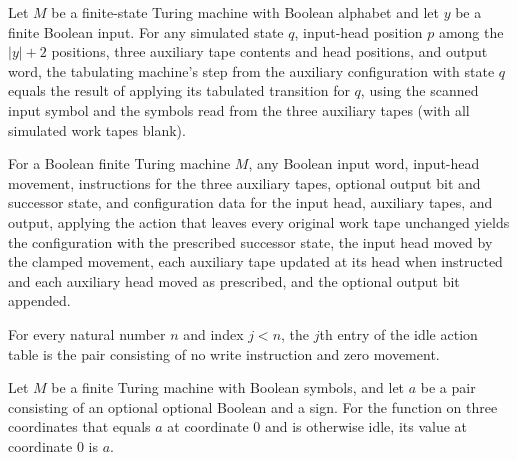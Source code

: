 \begin{theorem}
\label{Complexity.Meyer.acfg_step}
\leanok
{}
Let $M$ be a finite-state Turing machine with Boolean alphabet and let $y$ be a finite
Boolean input. For any simulated state $q$, input-head position $p$ among the $|y|+2$
positions, three auxiliary tape contents and head positions, and output word, the
tabulating machine's step from the auxiliary configuration with state $q$ equals the
result of applying its tabulated transition for $q$, using the scanned input symbol and
the symbols read from the three auxiliary tapes (with all simulated work tapes blank).
\end{theorem}

\begin{theorem}
\label{Complexity.Meyer.tact_idle_apply}
\leanok
{}
For a Boolean finite Turing machine $M$, any Boolean input word, input-head movement,
instructions for the three auxiliary tapes, optional output bit and successor state, and
configuration data for the input head, auxiliary tapes, and output, applying the action
that leaves every original work tape unchanged yields the configuration with the
prescribed successor state, the input head moved by the clamped movement, each auxiliary
tape updated at its head when instructed and each auxiliary head moved as prescribed,
and the optional output bit appended.
\end{theorem}

\begin{theorem}
\label{Complexity.Meyer.idle_apply}
\leanok
{}
For every natural number $n$ and index $j<n$, the $j$th entry of the idle action table
is the pair consisting of no write instruction and zero movement.
\end{theorem}

\begin{theorem}
\label{Complexity.Meyer.one_0_0}
\leanok
{}
Let $M$ be a finite Turing machine with Boolean symbols, and let $a$ be a pair
consisting of an optional optional Boolean and a sign. For the function on three
coordinates that equals $a$ at coordinate $0$ and is otherwise idle, its value at
coordinate $0$ is $a$.
\end{theorem}

